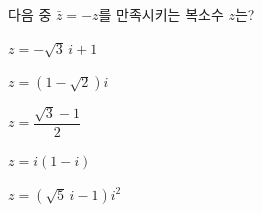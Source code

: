 다음 중 $\bar{z}=-z$를 만족시키는 복소수 $z$는? 
\begin{choicesii}{\rule[-3ex]{0pt}{8ex}$z=-\sqrt{3}\,i+1$}{\rule[-3ex]{0pt}{8ex}$z=(1-\sqrt{2})i$}{\rule[-3ex]{0pt}{8ex}$z=\dfrac{\sqrt{3}-1}{2}$}{\rule[-3ex]{0pt}{8ex}$z=i(1-i)$}{\rule[-3ex]{0pt}{8ex}$z=(\sqrt{5}\,i-1)i^2$}\end{choicesii}
